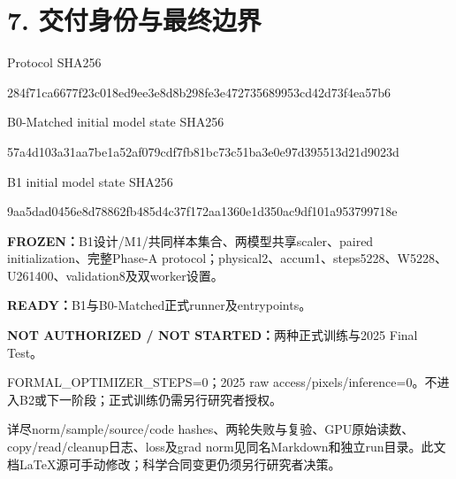 \documentclass[10pt,a4paper,fontset=windows]{ctexart}
\begin{document}
\section*{7. 交付身份与最终边界}
\par\noindent Protocol SHA256\par{\small\ttfamily 284f71ca6677f23c018ed9ee3e8d8b298fe3e472735689953cd42d73f4ea57b6}\par
\par\noindent B0-Matched initial model state SHA256\par{\small\ttfamily 57a4d103a31aa7be1a52af079cdf7fb81bc73c51ba3e0e97d395513d21d9023d}\par
\par\noindent B1 initial model state SHA256\par{\small\ttfamily 9aa5dad0456e8d78862fb485d4c37f172aa1360e1d350ac9df101a953799718e}\par
\textbf{FROZEN：}B1设计/M1/共同样本集合、两模型共享scaler、paired initialization、完整Phase-A protocol；physical2、accum1、steps5228、W5228、U261400、validation8及双worker设置。

\textbf{READY：}B1与B0-Matched正式runner及entrypoints。

\textbf{NOT AUTHORIZED / NOT STARTED：}两种正式训练与2025 Final Test。\par FORMAL\_OPTIMIZER\_STEPS=0；2025 raw access/pixels/inference=0。不进入B2或下一阶段；正式训练仍需另行研究者授权。

详尽norm/sample/source/code hashes、两轮失败与复验、GPU原始读数、copy/read/cleanup日志、loss及grad norm见同名Markdown和独立run目录。此文档LaTeX源可手动修改；科学合同变更仍须另行研究者决策。
\endgroup
\end{document}

